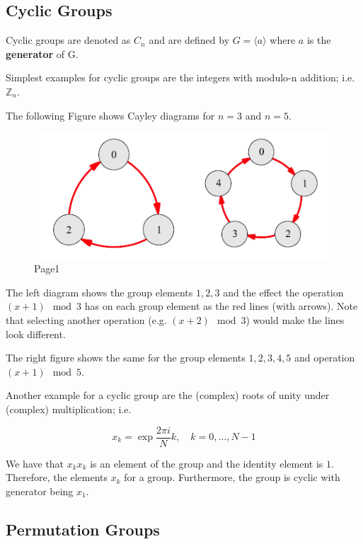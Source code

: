 
\subsection{Cyclic Groups}\label{cyclic-groups}

Cyclic groups are denoted as \(C_n\) and are defined by
\(G =\langle a \rangle\) where \(a\) is the \textbf{generator} of G.

Simplest examples for cyclic groups are the integers with modulo-n
addition; i.e. \(\mathbb{Z}_n\).

The following Figure shows Cayley diagrams for \(n=3\) and \(n=5\).

\begin{figure}[H]
\centering
\includegraphics{images/groups_03_1.png}
\caption{Page1}
\end{figure}

The left diagram shows the group elements \(1,2,3\) and the effect the
operation \((x + 1) \mod 3\) has on each group element as the red lines
(with arrows). Note that selecting another operation (e.g.
\((x + 2) \mod 3\)) would make the lines look different.

The right figure shows the same for the group elements \(1,2,3,4,5\) and
operation \((x + 1) \mod 5\).

Another example for a cyclic group are the (complex) roots of unity
under (complex) multiplication; i.e.

\[
x_k = \exp \frac{2\pi i}{N} k, \quad k=0,\ldots,N-1
\]

We have that \(x_k x_k\) is an element of the group and the identity
element is \(1\). Therefore, the elements \(x_k\) for a group.
Furthermore, the group is cyclic with generator being \(x_1\).

\subsection{Permutation Groups}\label{permutation-groups}

